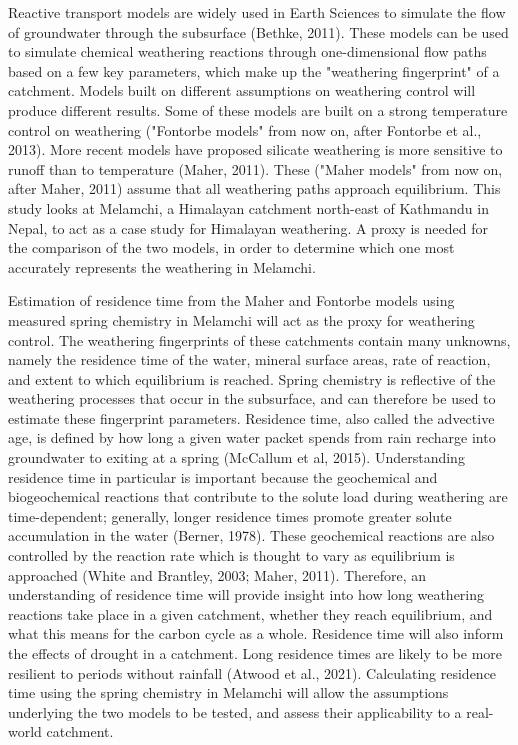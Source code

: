 \bsk

Reactive transport models are widely used in Earth Sciences to simulate the flow of groundwater through the subsurface (Bethke, 2011). These models can be used to simulate chemical weathering reactions through one-dimensional flow paths based on a few key parameters, which make up the "weathering fingerprint" of a catchment. Models built on different assumptions on weathering control will produce different results. Some of these models are built on a strong temperature control on weathering ("Fontorbe models" from now on, after Fontorbe et al., 2013). More recent models have proposed silicate weathering is more sensitive to runoff than to temperature (Maher, 2011). These ("Maher models" from now on, after Maher, 2011) assume that all weathering paths approach equilibrium. This study looks at Melamchi, a Himalayan catchment north-east of Kathmandu in Nepal, to act as a case study for Himalayan weathering. A proxy is needed for the comparison of the two models, in order to determine which one most accurately represents the weathering in Melamchi.

\bsk

Estimation of residence time from the Maher and Fontorbe models using measured spring chemistry in Melamchi will act as the proxy for weathering control. The weathering fingerprints of these catchments contain many unknowns, namely the residence time of the water, mineral surface areas, rate of reaction, and extent to which equilibrium is reached. Spring chemistry is reflective of the weathering processes that occur in the subsurface, and can therefore be used to estimate these fingerprint parameters. Residence time, also called the advective age, is defined by how long a given water packet spends from rain recharge into groundwater to exiting at a spring (McCallum et al, 2015). Understanding residence time in particular is important because the geochemical and biogeochemical reactions that contribute to the solute load during weathering are time-dependent; generally, longer residence times promote greater solute accumulation in the water (Berner, 1978). These geochemical reactions are also controlled by the reaction rate which is thought to vary as equilibrium is approached (White and Brantley, 2003; Maher, 2011). Therefore, an understanding of residence time will provide insight into how long weathering reactions take place in a given catchment, whether they reach equilibrium, and what this means for the carbon cycle as a whole. Residence time will also inform the effects of drought in a catchment. Long residence times are likely to be more resilient to periods without rainfall (Atwood et al., 2021). Calculating residence time using the spring chemistry in Melamchi will allow the assumptions underlying the two models to be tested, and assess their applicability to a real-world catchment.

